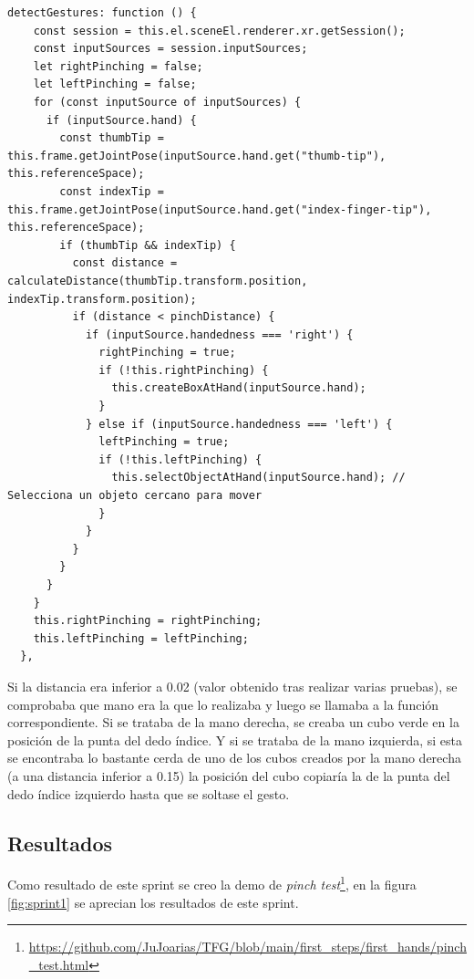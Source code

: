 \documentclass[a4paper, 12pt]{book}
\begin{document}
\begin{lstlisting}[caption=Función detectGestures, captionpos=b, label=lst:firstdetectGesture]
  detectGestures: function () {
    const session = this.el.sceneEl.renderer.xr.getSession();
    const inputSources = session.inputSources;
    let rightPinching = false;
    let leftPinching = false;
    for (const inputSource of inputSources) {
      if (inputSource.hand) {
        const thumbTip = this.frame.getJointPose(inputSource.hand.get("thumb-tip"), this.referenceSpace);
        const indexTip = this.frame.getJointPose(inputSource.hand.get("index-finger-tip"), this.referenceSpace);
        if (thumbTip && indexTip) {
          const distance = calculateDistance(thumbTip.transform.position, indexTip.transform.position);
          if (distance < pinchDistance) {
            if (inputSource.handedness === 'right') {
              rightPinching = true;
              if (!this.rightPinching) {
                this.createBoxAtHand(inputSource.hand);  
              }
            } else if (inputSource.handedness === 'left') {
              leftPinching = true;
              if (!this.leftPinching) {
                this.selectObjectAtHand(inputSource.hand); // Selecciona un objeto cercano para mover
              }
            }
          }
        }
      }
    }
    this.rightPinching = rightPinching;
    this.leftPinching = leftPinching;
  },
\end{lstlisting}

Si la distancia era inferior a 0.02 (valor obtenido tras realizar varias pruebas), se comprobaba que mano era la que lo realizaba y luego se llamaba a la función correspondiente. 
Si se trataba de la mano derecha, se creaba un cubo verde en la posición de la punta del dedo índice. Y si se trataba de la mano izquierda, si esta se encontraba lo bastante cerda de uno de los cubos creados por la mano derecha (a una distancia inferior a 0.15) la posición del cubo copiaría la de la punta del dedo índice izquierdo hasta que se soltase el gesto.

\subsection{Resultados}
\label{subsec:resultados1}

Como resultado de este sprint se creo la demo de \textit{pinch test}\footnote{\url{https://github.com/JuJoarias/TFG/blob/main/first_steps/first_hands/pinch_test.html}}, en la figura \ref{fig:sprint1} se aprecian los resultados de este sprint.
\end{document}
